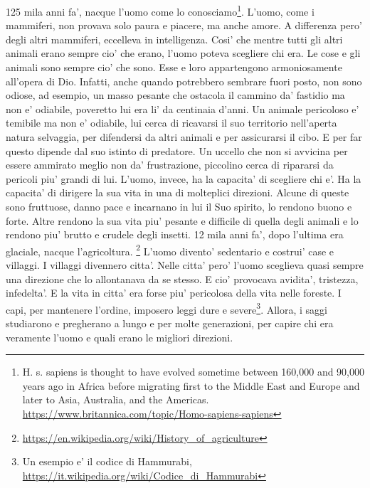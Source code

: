 {125 mila anni fa', nacque l'uomo come lo conosciamo\footnote{H. s. sapiens is thought to have evolved sometime between 160,000 and 90,000 years ago in Africa before migrating first to the Middle East and Europe and later to Asia, Australia, and the Americas. \url{https://www.britannica.com/topic/Homo-sapiens-sapiens}}. L'uomo, come i mammiferi, non provava solo paura e piacere, ma anche amore. A differenza pero' degli altri mammiferi, eccelleva in intelligenza. Cosi' che mentre tutti gli altri animali erano sempre cio' che erano, l'uomo poteva scegliere chi era. Le cose e gli animali sono sempre cio' che sono. Esse e loro appartengono armoniosamente  all'opera di Dio. Infatti, anche quando potrebbero sembrare fuori posto, non sono odiose, ad esempio, un masso pesante che ostacola il cammino da' fastidio ma non e' odiabile, poveretto lui era li' da centinaia d'anni. Un animale pericoloso e' temibile ma non e' odiabile, lui cerca di ricavarsi il suo territorio nell'aperta natura selvaggia, per difendersi da altri animali e per assicurarsi il cibo. E per far questo dipende dal suo istinto di predatore. Un uccello che non si avvicina per essere ammirato meglio non da' frustrazione, piccolino cerca di ripararsi da pericoli piu' grandi di lui.
  L'uomo, invece, ha la capacita' di scegliere chi e'. Ha la capacita' di dirigere la sua vita in una di molteplici direzioni. Alcune di queste sono fruttuose, danno pace e incarnano in lui il Suo spirito, lo rendono buono e forte. Altre rendono la sua vita piu' pesante e difficile di quella degli animali e lo rendono piu' brutto e crudele degli insetti.
  12 mila anni fa', dopo l'ultima era glaciale, nacque l'agricoltura. \footnote{\url{https://en.wikipedia.org/wiki/History\_of\_agriculture}} L'uomo divento' sedentario e costrui' case e villaggi. I villaggi divennero citta'. Nelle citta' pero' l'uomo sceglieva quasi sempre una direzione che lo allontanava da se stesso. E cio' provocava avidita', tristezza, infedelta'. E la vita in citta' era forse piu' pericolosa della vita nelle foreste.
  I capi, per mantenere l'ordine, imposero leggi dure e severe\footnote{Un esempio e' il codice di Hammurabi, \url{https://it.wikipedia.org/wiki/Codice\_di\_Hammurabi}}. Allora, i saggi studiarono e pregherano a lungo e per molte generazioni, per capire chi era veramente l'uomo e quali erano le migliori direzioni. 
}
